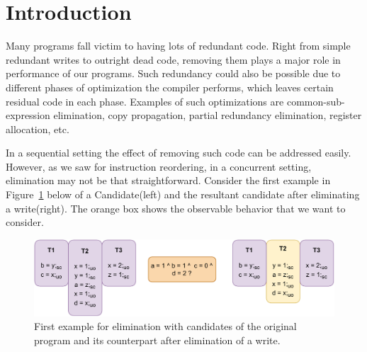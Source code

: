 \section{Introduction}

    Many programs fall victim to having lots of redundant code.
    Right from simple redundant writes to outright dead code, removing them plays a major role in performance of our programs. 
    Such redundancy could also be possible due to different phases of optimization the compiler performs, which leaves certain residual code in each phase.
    Examples of such optimizations are common-sub-expression elimination, copy propagation, partial redundancy elimination, register allocation, etc.
    
    In a sequential setting the effect of removing such code can be addressed easily.    
    However, as we saw for instruction reordering, in a concurrent setting, elimination may not be that straightforward. 
    Consider the first example in Figure~\ref{elim:example1(a)} below of a Candidate(left) and the resultant candidate after eliminating a write(right).
    The orange box shows the observable behavior that we want to consider. 
    \begin{figure}[H]
        \centering
        \includegraphics[scale=0.7]{5.Elimination/EliminationExample1(a).pdf}
        \caption{First example for elimination with candidates of the original program and its counterpart after elimination of a write.} 
        \label{elim:example1(a)}
    \end{figure}

